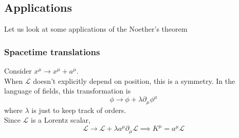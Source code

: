 \documentclass[11pt]{article}
\newcommand{\del}{\partial}
\newcommand{\ld}{\mathcal{L}}
\numberwithin{equation}{section}
\begin{document}
    

    \subsection{Applications}
    Let us look at some applications of the Noether's theorem
    \subsubsection{Spacetime translations}
    Consider \(x^\mu \to x^\mu + a^\mu\).\\
    When \(\ld\) doesn't explicitly depend on position, this is a symmetry. In the language of fields, this transformation is 
    \begin{equation*}
        \phi \to \phi + \lambda \del_\mu \phi^\mu 
    \end{equation*}
    where \(\lambda\) is just to keep track of orders.\\

    Since \(\ld\) is a Lorentz scalar, 
    \begin{equation*}
        \ld \to \ld + \lambda a^\mu \del_\mu \ld \implies K^\mu =  a^\mu \ld
    \end{equation*}
\end{document}
